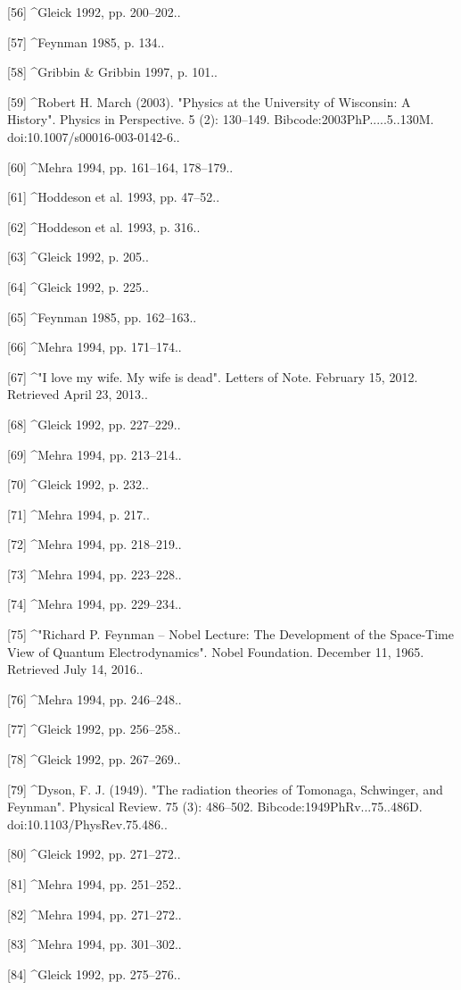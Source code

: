 [56]
^Gleick 1992, pp. 200–202..

[57]
^Feynman 1985, p. 134..

[58]
^Gribbin & Gribbin 1997, p. 101..

[59]
^Robert H. March (2003). "Physics at the University of Wisconsin: A History". Physics in Perspective. 5 (2): 130–149. Bibcode:2003PhP.....5..130M. doi:10.1007/s00016-003-0142-6..

[60]
^Mehra 1994, pp. 161–164, 178–179..

[61]
^Hoddeson et al. 1993, pp. 47–52..

[62]
^Hoddeson et al. 1993, p. 316..

[63]
^Gleick 1992, p. 205..

[64]
^Gleick 1992, p. 225..

[65]
^Feynman 1985, pp. 162–163..

[66]
^Mehra 1994, pp. 171–174..

[67]
^"I love my wife. My wife is dead". Letters of Note. February 15, 2012. Retrieved April 23, 2013..

[68]
^Gleick 1992, pp. 227–229..

[69]
^Mehra 1994, pp. 213–214..

[70]
^Gleick 1992, p. 232..

[71]
^Mehra 1994, p. 217..

[72]
^Mehra 1994, pp. 218–219..

[73]
^Mehra 1994, pp. 223–228..

[74]
^Mehra 1994, pp. 229–234..

[75]
^"Richard P. Feynman – Nobel Lecture: The Development of the Space-Time View of Quantum Electrodynamics". Nobel Foundation. December 11, 1965. Retrieved July 14, 2016..

[76]
^Mehra 1994, pp. 246–248..

[77]
^Gleick 1992, pp. 256–258..

[78]
^Gleick 1992, pp. 267–269..

[79]
^Dyson, F. J. (1949). "The radiation theories of Tomonaga, Schwinger, and Feynman". Physical Review. 75 (3): 486–502. Bibcode:1949PhRv...75..486D. doi:10.1103/PhysRev.75.486..

[80]
^Gleick 1992, pp. 271–272..

[81]
^Mehra 1994, pp. 251–252..

[82]
^Mehra 1994, pp. 271–272..

[83]
^Mehra 1994, pp. 301–302..

[84]
^Gleick 1992, pp. 275–276..

